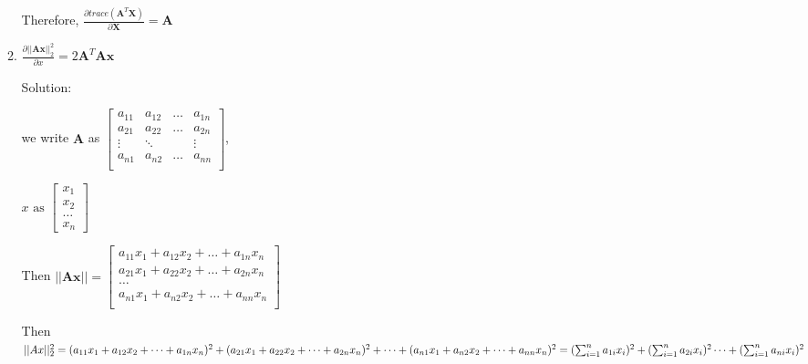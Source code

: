 \documentclass[12pt]{article}
\newcommand{\solu}{{\color{blue} Solution:}}
\begin{document}
\begin{enumerate}
\begin{enumerate}
            Therefore, $\frac{\partial trace(\pmb{A}^T\pmb{X})}{\partial \pmb{X}} = \pmb{A}$ 
            
            \item $\frac{\partial ||\pmb{Ax}||^2_2}{\partial x} = 2\pmb{A}^T \pmb{A}\pmb{x}$
            
            \solu 

            we write $\pmb{A}$ as $\begin{bmatrix}
                a_{11} & a_{12} & \dots & a_{1n} \\
                a_{21} & a_{22} & \dots & a_{2n} \\
                \vdots & \ddots &  & \vdots \\
                a_{n1} & a_{n2} & \dots & a_{nn} \\
            \end{bmatrix}$,

            $x \text{ as } \begin{bmatrix}
                x_1 \\ x_2 \\ \dots \\ x_n
            \end{bmatrix}$

            Then $||\pmb{Ax}|| = \begin{bmatrix}
                a_{11}x_1 + a_{12}x_2 + \dots + a_{1n}x_n \\
                a_{21}x_1 + a_{22}x_2 + \dots + a_{2n}x_n \\
                \dots \\
                a_{n1}x_1 + a_{n2}x_2 + \dots + a_{nn}x_n \\
            \end{bmatrix}$

            Then $||Ax||^2_2 \\
            = (a_{11}x_1 + a_{12}x_2 + \dots + a_{1n}x_n)^2 + (a_{21}x_1 + a_{22}x_2 + \dots + a_{2n}x_n)^2 + \dots + (a_{n1}x_1 + a_{n2}x_2 + \dots + a_{nn}x_n)^2 \\
            = (\sum_{i = 1}^n a_{1i}x_i)^2 + (\sum_{i = 1}^n a_{2i}x_i)^2 \dots + (\sum_{i = 1}^n a_{ni}x_i)^2 \\$


\end{enumerate}
\end{enumerate}
\end{document}
